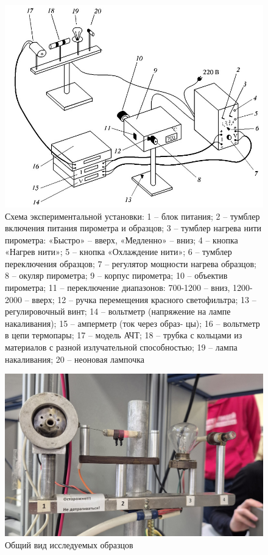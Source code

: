\documentclass[14pt, a4paper]{report}
\begin{document}
\begin{figure}[H]
\centering
\includegraphics[width=.8\linewidth]{../images/581-5}
\caption{Схема экспериментальной установки: 1 -- блок питания; 2 -- тумблер включения питания пирометра и образцов; 3 -- тумблер нагрева нити пирометра:  «Быстро» -- вверх,  «Медленно» -- вниз; 4 -- кнопка  «Нагрев нити»; 5 -- кнопка  «Охлаждение нити»; 6 -- тумблер переключения образцов; 7 -- регулятор мощности нагрева образцов; 8 -- окуляр пирометра; 9 -- корпус пирометра; 10 -- объектив пирометра; 11 -- переключение диапазонов: 700-1200 -- вниз, 1200-2000 -- вверх; 12 -- ручка перемещения красного светофильтра; 13 -- регулировочный винт; 14 -- вольтметр (напряжение на лампе накаливания); 15 -- амперметр (ток через образ-
цы); 16 -- вольтметр в цепи термопары; 17 -- модель АЧТ; 18 -- трубка с кольцами из материалов с разной излучательной способностью; 19 -- лампа накаливания; 20 -- неоновая лампочка}
\end{figure}

\begin{figure}[H]
\centering
\includegraphics[width=.8\linewidth]{../images/581-4}
\caption{Общий вид исследуемых образцов}
\end{figure}
\end{document}
